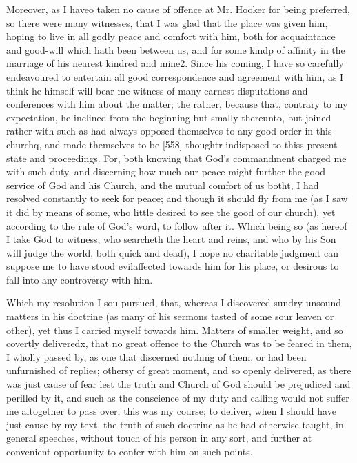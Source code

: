Moreover, as I haveo taken no cause of offence at Mr. Hooker for being preferred, so there were many witnesses, that I was glad that the place was given him, hoping to live in all godly peace and comfort with him, both for acquaintance and good-will which hath been between us, and for some kindp of affinity in the marriage of his nearest kindred and mine2. Since his coming, I have so carefully endeavoured to entertain all good correspondence and agreement with him, as I think he himself will bear me witness of many earnest disputations and conferences with him about the matter; the rather, because that, contrary to my expectation, he inclined from the beginning but smally thereunto, but joined rather with such as had always opposed themselves to any good order in this churchq, and made themselves to be [558] thoughtr indisposed to thiss present state and proceedings. For, both knowing that God’s commandment charged me with such duty, and discerning how much our peace might further the good service of God and his Church, and the mutual comfort of us botht, I had resolved constantly to seek for peace; and though it should fly from me (as I saw it did by means of some, who little desired to see the good of our church), yet according to the rule of God’s word, to follow after it. Which being so (as hereof I take God to witness, who searcheth the heart and reins, and who by his Son will judge the world, both quick and dead), I hope no charitable judgment can suppose me to have stood evilaffected towards him for his place, or desirous to fall into any controversy with him.

Which my resolution I sou pursued, that, whereas I discovered sundry unsound matters in his doctrine (as many of his sermons tasted of some sour leaven or other), yet thus I carried myself towards him. Matters of smaller weight, and so covertly deliveredx, that no great offence to the Church was to be feared in them, I wholly passed by, as one that discerned nothing of them, or had been unfurnished of replies; othersy of great moment, and so openly delivered, as there was just cause of fear lest the truth and Church of God should be prejudiced and perilled by it, and such as the conscience of my duty and calling would not suffer me altogether to pass over, this was my course; to deliver, when I should have just cause by my text, the truth of such doctrine as he had otherwise taught, in general speeches, without touch of his person in any sort, and further at convenient opportunity to confer with him on such points.

